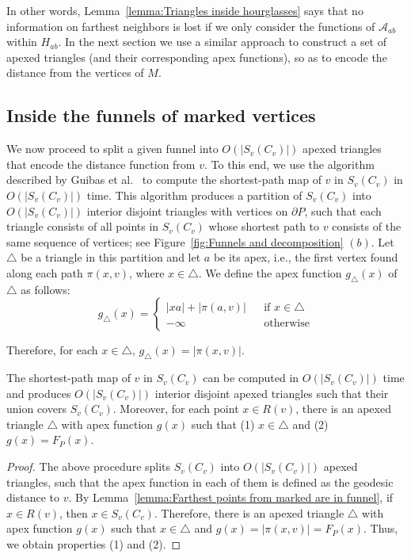 \documentclass[a4paper,UKenglish]{lipics}
\newcommand{\F}[2]{\ensuremath{F_{\scriptscriptstyle #1}(#2)}}
\newcommand{\fn}[2]{\ensuremath{S_{\scriptscriptstyle #1}(#2)}}
\newcommand{\g}[2]{\ensuremath{|\pi(#1, #2)|}}
\newcommand{\p}[2]{\ensuremath{\pi(#1, #2)}}
\begin{document}
In other words, Lemma~\ref{lemma:Triangles inside hourglasses} says that no information on farthest neighbors is lost if we only consider the functions of $\mathcal A_{ab}$ within $H_{ab}$.  
In the next section we use a similar approach to construct a set of apexed triangles (and their corresponding apex functions), so as to encode the distance from the vertices of $M$.

\subsection{Inside the funnels of marked vertices}

We now proceed to split a given funnel into $O(|\fn{v}{C_v}|)$ apexed triangles that encode the distance function from $v$. 
To this end, we use the algorithm described by Guibas et al.~\cite[Section 2]{guibasShortestPathQueries} to compute the shortest-path map of $v$ in $\fn{v}{C_v}$ in $O(|\fn{v}{C_v}|)$ time.
This algorithm produces a partition of $\fn{v}{C_v}$ into $O(|\fn{v}{C_v}|)$ interior disjoint triangles with vertices on $\partial P$, such that each triangle consists of all points in $\fn{v}{C_v}$ whose shortest path to $v$ consists of the same sequence of vertices; see Figure~\ref{fig:Funnels and decomposition} $(b)$.
Let $\triangle$ be a triangle in this partition and let $a$ be its apex, i.e., the first vertex found along each path $\p{x}{v}$, where $x\in \triangle$. We define the apex function $g_\triangle(x)$ of $\triangle$ as follows:
$$g_\triangle(x) = \left\{ \begin{array}{lll}
|x a| + \g{a}{v} && \text{if }x\in \triangle\\
-\infty&&\text{otherwise}
\end{array}\right.$$

Therefore, for each $x\in \triangle$, $g_\triangle(x) = \g{x}{v}$.

\begin{lemma}\label{lemma:Triangles inside funnels}
The shortest-path map of $v$ in $\fn{v}{C_v}$ can be computed in $O(|\fn{v}{C_v}|)$ time and produces $O(|\fn{v}{C_v}|)$ interior disjoint apexed triangles such that their union covers $\fn{v}{C_v}$. 
Moreover, for each point $x\in R(v)$,  
there is an apexed triangle $\triangle$ with apex function $g(x)$ such that 
(1) $x\in \triangle$ and (2) $g(x) = \F{P}{x}$.
\end{lemma}
\begin{proof}
The above procedure splits $\fn{v}{C_v}$ into $O(|\fn{v}{C_v}|)$ apexed triangles, such that the apex function in each of them is defined as the geodesic distance to $v$. 
By Lemma~\ref{lemma:Farthest points from marked are in funnel}, if $x\in R(v)$, then $x\in \fn{v}{C_v}$. 
Therefore, there is an apexed triangle $\triangle$ with apex function $g(x)$ such that $x\in \triangle$ and $g(x) = \g{x}{v} = \F{P}{x}$. Thus, we obtain properties (1) and (2).
\end{proof}
\end{document}
